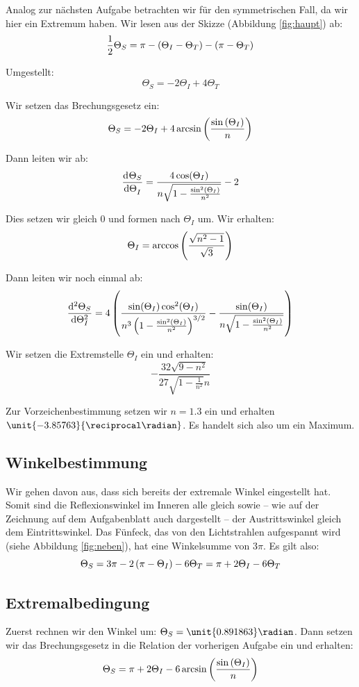 Analog zur nächsten Aufgabe betrachten wir für den symmetrischen Fall, da wir
hier ein Extremum haben. Wir lesen aus der Skizze (Abbildung \ref{fig:haupt})
ab:
\[
	\half \Theta_S = \pi - \del{\Theta_I - \Theta_T} - \del{\pi - \Theta_T}
\]

Umgestellt:
\[
	\Theta_S = - 2 \Theta_I + 4 \Theta_T
\]

Wir setzen das Brechungsgesetz ein:
\[
	\Theta_S = - 2 \Theta_I + 4 \arcsin\del{\frac{\sin\del{\Theta_I}} n}
\]

Dann leiten wir ab:
\[
	\dod{\Theta_S}{\Theta_I} = \frac{4 \cos (\Theta_I)}{n \sqrt{1-\frac{\sin ^2(\Theta_I)}{n^2}}}-2 
\]

Dies setzen wir gleich 0 und formen nach $\Theta_I$ um. Wir erhalten:
\[
	\Theta_I = \arccos\del{\frac{\sqrt{n^2-1}}{\sqrt{3}}}
\]

Dann leiten wir noch einmal ab:
\[
	\dod[2]{\Theta_S}{\Theta_I} = 4 \left(\frac{\sin (\Theta_I) \cos ^2(\Theta_I)}{n^3 \left(1-\frac{\sin ^2(\Theta_I)}{n^2}\right)^{3/2}}-\frac{\sin (\Theta_I)}{n \sqrt{1-\frac{\sin ^2(\Theta_I)}{n^2}}}\right) 
\]

Wir setzen die Extremstelle $\Theta_I$ ein und erhalten:
\[
	-\frac{32 \sqrt{9-n^2}}{27 \sqrt{1-\frac{1}{n^2}} n}
\]

Zur Vorzeichenbestimmung setzen wir $n = 1.3$ ein und erhalten
$\unit{-3.85763}{\reciprocal\radian}$. Es handelt sich also um ein Maximum.

\subsection{Winkelbestimmung}

Wir gehen davon aus, dass sich bereits der extremale Winkel eingestellt hat.
Somit sind die Reflexionswinkel im Inneren alle gleich sowie -- wie auf der
Zeichnung auf dem Aufgabenblatt auch dargestellt -- der Austrittswinkel gleich
dem Eintrittswinkel. Das Fünfeck, das von den Lichtstrahlen aufgespannt wird
(siehe Abbildung \ref{fig:neben}), hat eine Winkelsumme von $3 \pi$. Es gilt
also:
\[
	\Theta_S = 3 \pi - 2 \del{\pi - \Theta_I} - 6 \Theta_T
	= \pi + 2 \Theta_I - 6 \Theta_T
\]

\subsection{Extremalbedingung}

Zuerst rechnen wir den Winkel um: $\Theta_S = \unit{0.891863}\radian$. Dann setzen wir das Brechungsgesetz in die Relation der vorherigen Aufgabe ein und erhalten:
\[
	\Theta_S = \pi + 2 \Theta_I - 6 \arcsin\del{\frac{\sin\del{\Theta_I}} n}
\]

